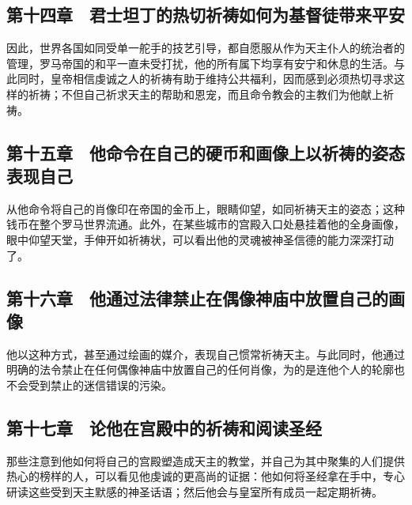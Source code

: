 \subsection{第十四章　君士坦丁的热切祈祷如何为基督徒带来平安}

因此，世界各国如同受单一舵手的技艺引导，都自愿服从作为天主仆人的统治者的管理，罗马帝国的和平一直未受打扰，他的所有属下均享有安宁和休息的生活。与此同时，皇帝相信虔诚之人的祈祷有助于维持公共福利，因而感到必须热切寻求这样的祈祷；不但自己祈求天主的帮助和恩宠，而且命令教会的主教们为他献上祈祷。\par


\subsection{第十五章　他命令在自己的硬币和画像上以祈祷的姿态表现自己}

从他命令将自己的肖像印在帝国的金币上，眼睛仰望，如同祈祷天主的姿态；这种钱币在整个罗马世界流通。此外，在某些城市的宫殿入口处悬挂着他的全身画像，眼中仰望天堂，手伸开如祈祷状，可以看出他的灵魂被神圣信德的能力深深打动了。\par


\subsection{第十六章　他通过法律禁止在偶像神庙中放置自己的画像}

他以这种方式，甚至通过绘画的媒介，表现自己惯常祈祷天主。与此同时，他通过明确的法令禁止在任何偶像神庙中放置自己的任何肖像，为的是连他个人的轮廓也不会受到禁止的迷信错误的污染。\par


\subsection{第十七章　论他在宫殿中的祈祷和阅读圣经}

那些注意到他如何将自己的宫殿塑造成天主的教堂，并自己为其中聚集的人们提供热心的榜样的人，可以看见他虔诚的更高尚的证据：他如何将圣经拿在手中，专心研读这些受到天主默感的神圣话语；然后他会与皇室所有成员一起定期祈祷。\par

